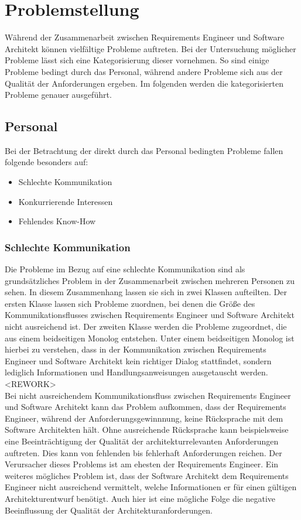 \section{Problemstellung}
Während der Zusammenarbeit zwischen Requirements Engineer und Software Architekt können vielfältige Probleme auftreten. Bei der Untersuchung möglicher Probleme lässt sich eine Kategorisierung dieser vornehmen. So sind einige Probleme bedingt durch das Personal, während andere Probleme sich aus der Qualität der Anforderungen ergeben. Im folgenden werden die kategorisierten Probleme genauer ausgeführt.

\subsection{Personal}
Bei der Betrachtung der direkt durch das Personal bedingten Probleme fallen folgende besonders auf:
\begin{itemize} 
\item Schlechte Kommunikation
\item Konkurrierende Interessen
\item Fehlendes Know-How \\
\end{itemize}

\subsubsection{Schlechte Kommunikation}
Die Probleme im Bezug auf eine schlechte Kommunikation sind als grundsätzliches Problem in der Zusammenarbeit zwischen mehreren Personen zu sehen. In diesem Zusammenhang lassen sie sich in zwei Klassen aufteilten. Der ersten Klasse lassen sich Probleme zuordnen, bei denen die Größe des Kommunikationsflusses zwischen Requirements Engineer und Software Architekt nicht ausreichend ist. Der zweiten Klasse werden die Probleme zugeordnet, die aus einem beidseitigen Monolog entstehen. Unter einem beidseitigen Monolog ist hierbei zu verstehen, dass in der Kommunikation zwischen Requirements Engineer und Software Architekt kein richtiger Dialog stattfindet, sondern lediglich Informationen und Handlungsanweisungen ausgetauscht werden. <REWORK>\\

Bei nicht ausreichendem Kommunikationsfluss zwischen Requirements Engineer und Software Architekt kann das Problem aufkommen, dass der Requirements Engineer, während der Anforderungsgewinnnung, keine Rücksprache mit dem Software Architekten hält. Ohne ausreichende Rücksprache kann beispielsweise eine Beeinträchtigung der Qualität der architekturrelevanten Anforderungen auftreten. Dies kann von fehlenden bis fehlerhaft Anforderungen reichen. Der Verursacher dieses Problems ist am ehesten der Requirements Engineer. Ein weiteres mögliches Problem ist, dass der Software Architekt dem Requirements Engineer nicht ausreichend vermittelt, welche Informationen er für einen gültigen Architekturentwurf benötigt. Auch hier ist eine mögliche Folge die negative Beeinflussung der Qualität der Architekturanforderungen.\\

